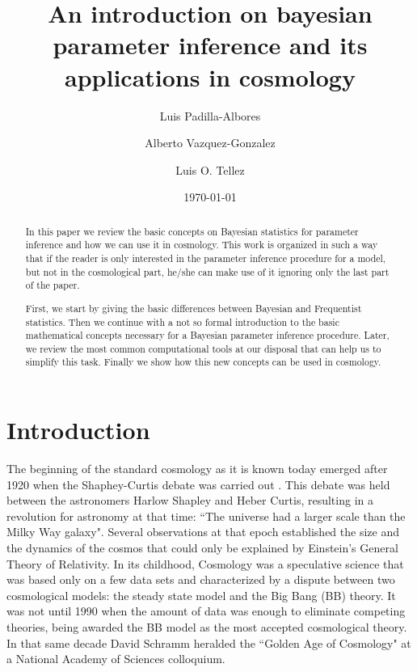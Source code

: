 \documentclass[onecolumn,           %
               showpacs,            %
               preprintnumbers,     %
               aps,                 %
               prl,          	    %
               letterpaper,             %
               superscriptaddress,      %
               nofootinbib,         %
               tightenlines,        %
               floats,floatfix      %
               ,usenatbib,
               ]{revtex4-1}
\begin{document}
\title{An introduction on bayesian parameter inference and its applications in cosmology}
\author{Luis Padilla-Albores}  
   \author{Alberto Vazquez-Gonzalez}  
  \author{Luis O. Tellez}  
\date{\today}

\begin{abstract}

In this paper we review the basic concepts on Bayesian statistics for parameter inference and how we can use it in cosmology. This work is organized in such a way that if the reader is only interested in the parameter inference procedure for a model, but not in the cosmological part, he/she can make use of it ignoring only the last part of the paper. 

First, we start by giving the basic differences between Bayesian and Frequentist statistics. Then we continue with a not so formal introduction to the basic mathematical concepts necessary for a Bayesian parameter inference procedure. Later, we review the most common computational tools at our disposal that can help us to simplify this task. Finally we show how this new concepts can be used in cosmology.     
\end{abstract}

\maketitle

\section{Introduction}

The beginning of the standard cosmology as it is known today emerged after 1920 when the Shaphey-Curtis debate was carried out \cite{debate}. This debate was held between the astronomers Harlow Shapley and Heber Curtis, resulting in a revolution for astronomy at that time: ``The universe had a larger scale than the Milky Way galaxy". Several observations at that epoch established the size and the dynamics of the cosmos that could only be explained by Einstein's General Theory of Relativity. In its childhood, Cosmology was a speculative science that was based only on a few data sets and characterized by a dispute between two cosmological models: the steady state model and the Big Bang (BB) theory. It was not until 1990 when the amount of data was enough to eliminate competing theories, being awarded the BB model as the most accepted cosmological theory. In that same decade David Schramm heralded the ``Golden Age of Cosmology" at a National Academy of Sciences colloquium.    
\end{document}
